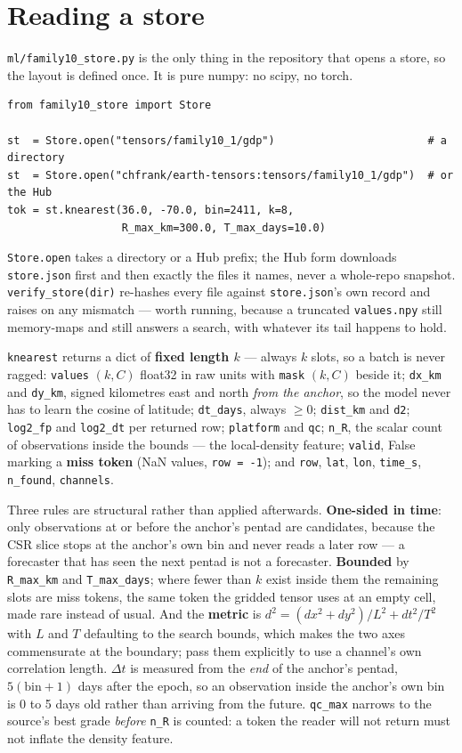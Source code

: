 \documentclass[10pt]{article}
\newcommand{\code}[1]{\texttt{#1}}
\begin{document}
\section{Reading a store}

\code{ml/family10\_store.py} is the only thing in the repository that opens a
store, so the layout is defined once. It is pure numpy: no scipy, no torch.

\begin{verbatim}
from family10_store import Store

st  = Store.open("tensors/family10_1/gdp")                        # a directory
st  = Store.open("chfrank/earth-tensors:tensors/family10_1/gdp")  # or the Hub
tok = st.knearest(36.0, -70.0, bin=2411, k=8,
                  R_max_km=300.0, T_max_days=10.0)
\end{verbatim}

\code{Store.open} takes a directory or a Hub prefix; the Hub form downloads
\code{store.json} first and then exactly the files it names, never a whole-repo
snapshot. \code{verify\_store(dir)} re-hashes every file against
\code{store.json}'s own record and raises on any mismatch --- worth running,
because a truncated \code{values.npy} still memory-maps and still answers a
search, with whatever its tail happens to hold.

\code{knearest} returns a dict of \textbf{fixed length $k$} --- always $k$
slots, so a batch is never ragged: \code{values} $(k, C)$ float32 in raw units
with \code{mask} $(k, C)$ beside it; \code{dx\_km} and \code{dy\_km}, signed
kilometres east and north \emph{from the anchor}, so the model never has to
learn the cosine of latitude; \code{dt\_days}, always $\ge 0$; \code{dist\_km}
and \code{d2}; \code{log2\_fp} and \code{log2\_dt} per returned row;
\code{platform} and \code{qc}; \code{n\_R}, the scalar count of observations
inside the bounds --- the local-density feature; \code{valid}, False marking a
\textbf{miss token} (NaN values, \code{row = -1}); and \code{row}, \code{lat},
\code{lon}, \code{time\_s}, \code{n\_found}, \code{channels}.

Three rules are structural rather than applied afterwards. \textbf{One-sided in
time}: only observations at or before the anchor's pentad are candidates,
because the CSR slice stops at the anchor's own bin and never reads a later row
--- a forecaster that has seen the next pentad is not a forecaster.
\textbf{Bounded} by \code{R\_max\_km} and \code{T\_max\_days}; where fewer than
$k$ exist inside them the remaining slots are miss tokens, the same token the
gridded tensor uses at an empty cell, made rare instead of usual. And the
\textbf{metric} is $d^2 = (dx^2 + dy^2)/L^2 + dt^2/T^2$ with $L$ and $T$
defaulting to the search bounds, which makes the two axes commensurate at the
boundary; pass them explicitly to use a channel's own correlation length.
$\Delta t$ is measured from the \emph{end} of the anchor's pentad,
$5(\mathrm{bin}+1)$ days after the epoch, so an observation inside the anchor's
own bin is 0 to 5 days old rather than arriving from the future. \code{qc\_max}
narrows to the source's best grade \emph{before} \code{n\_R} is counted: a token
the reader will not return must not inflate the density feature.
\end{document}
